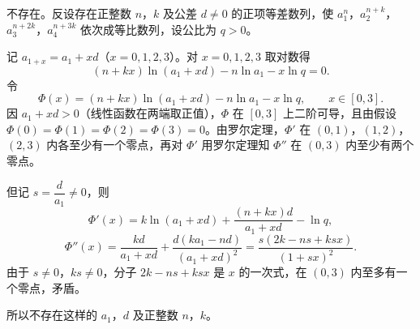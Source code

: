 \begin{answer}

不存在。反设存在正整数 \(n\)，\(k\) 及公差 \(d\ne0\) 的正项等差数列，使 \(a_{1}^{n}\)，\(a_{2}^{n+k}\)，\(a_{3}^{n+2k}\)，\(a_{4}^{n+3k}\) 依次成等比数列，设公比为 \(q>0\)。

记 \(a_{1+x}=a_{1}+xd\)（\(x=0,1,2,3\)）。对 \(x=0,1,2,3\) 取对数得
\nopagebreak[4]
\[
(n+kx)\ln(a_{1}+xd)-n\ln a_{1}-x\ln q=0.
\]
令
\nopagebreak[4]
\[
\Phi(x)=(n+kx)\ln(a_{1}+xd)-n\ln a_{1}-x\ln q,\qquad x\in[0,3].
\]
因 \(a_{1}+xd>0\)（线性函数在两端取正值），\(\Phi\) 在 \([0,3]\) 上二阶可导，且由假设 \(\Phi(0)=\Phi(1)=\Phi(2)=\Phi(3)=0\)。由罗尔定理，\(\Phi'\) 在 \((0,1)\)，\((1,2)\)，\((2,3)\) 内各至少有一个零点，再对 \(\Phi'\) 用罗尔定理知 \(\Phi''\) 在 \((0,3)\) 内至少有两个零点。

但记 \(s=\dfrac{d}{a_{1}}\ne0\)，则
\nopagebreak[4]
\[
\Phi'(x)=k\ln(a_{1}+xd)+\frac{(n+kx)d}{a_{1}+xd}-\ln q,
\]
\nopagebreak[4]
\[
\Phi''(x)=\frac{kd}{a_{1}+xd}+\frac{d(ka_{1}-nd)}{(a_{1}+xd)^{2}}
=\frac{s(2k-ns+ksx)}{(1+sx)^{2}}.
\]
由于 \(s\ne0\)，\(ks\ne0\)，分子 \(2k-ns+ksx\) 是 \(x\) 的一次式，在 \((0,3)\) 内至多有一个零点，矛盾。

所以不存在这样的 \(a_{1}\)，\(d\) 及正整数 \(n\)，\(k\)。




\end{answer}
